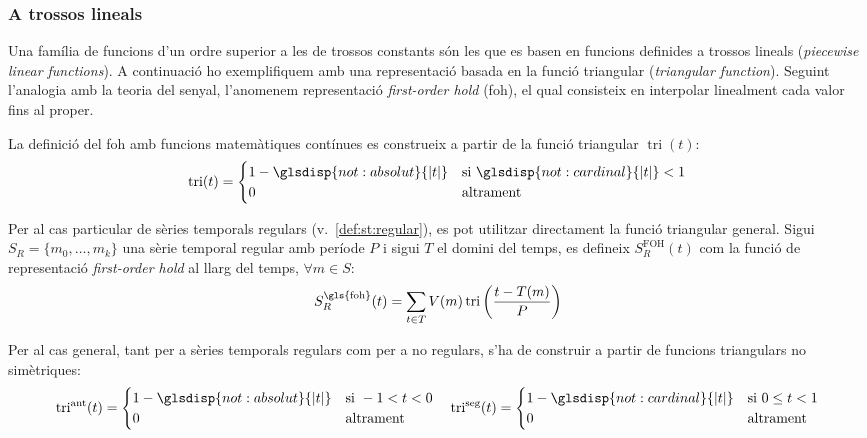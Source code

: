 \subsubsection{A trossos lineals}


Una família de funcions d'un ordre superior a les de trossos constants
són les que es basen en funcions definides a trossos lineals
(\emph{piecewise linear functions}).  A continuació ho exemplifiquem
amb una representació basada en la funció triangular (\emph{triangular
  function}). Seguint l'analogia amb la teoria del senyal, l'anomenem
representació \emph{first-order hold} (\gls{foh}), el qual consisteix
en interpolar linealment cada valor fins al proper.


La definició del \gls{foh} amb funcions matemàtiques contínues es construeix
a partir de la funció triangular $\operatorname{tri}(t)$:
\[
\operatorname{tri}(t) = 
\begin{cases}
  1-\glsdisp{not:absolut}{|t|} & \text{si } \glsdisp{not:cardinal}{|t|} < 1\\
  0 & \text{altrament}
\end{cases}
\]

Per al cas particular de sèries temporals regulars
(v.~\autoref{def:st:regular}), es pot utilitzar directament la funció
triangular general.  Sigui $S_R=\{m_0,\ldots,m_k\}$ una sèrie temporal
regular amb període $P$ i sigui $T$ el domini del temps, es defineix
$S^\text{FOH}_ R(t)$ com la funció de representació \emph{first-order
  hold} al llarg del temps, $\forall m \in S:$
\[
S_ R^\text{\gls{foh}}(t) = \sum_{t\in T} V(m)
\operatorname{tri}\left(\frac{t-T(m)}{P}\right)
\]



Per al cas general, tant per a sèries temporals regulars com per a no
regulars, s'ha de construir a partir de funcions triangulars no
simètriques:
\[
\operatorname{tri}^{\text{ant}}(t) = 
\begin{cases}
  1-\glsdisp{not:absolut}{|t|} & \text{si } -1 < t < 0\\
  0 & \text{altrament}
\end{cases}
\quad
\operatorname{tri}^{\text{seg}}(t) = 
\begin{cases}
  1-\glsdisp{not:cardinal}{|t|} & \text{si } 0 \leq t < 1\\
  0 & \text{altrament}
\end{cases}
\]


